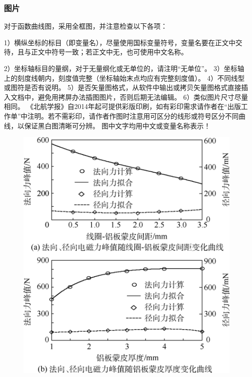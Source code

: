 \documentclass[10.5pt,twocolumn]{jbuaa}
\begin{document}
 \subsubsection{图片}
 对于函数曲线图，采用全框图，并注意检查以下各项：
 
 1）横纵坐标的标目（即变量名），尽量使用国标变量符号，变量名要在正文中交待，且与正文中符号一致；若正文中无，也可使用中文名称。
 
 2）坐标轴标目的量纲，对于无量纲化或无单位的，请注明``无单位”。
 3）坐标轴上的刻度线朝内，刻度值完整（坐标轴始末点均应有完整刻度值）。
 4）不同线型或图符是否有说明。
 5）是否矢量图格式，从软件中输出或拷贝矢量图格式直接插入文档中，避免用拷屏办法插图图片，否则后期无法编辑。
 6）类似图片尺寸尽量相同。
 《北航学报》自2014年起可提供彩版印刷，如有彩印需求请作者在“出版工作单”中注明。若不需彩印，请作者作图时注意用可区分的线形或符号区分不同曲线，以保证黑白图清晰可分辨。 
 图中文字均用中文或变量名称表示！
 \begin{figure}[b!]
 \centering
 \includegraphics [scale=1,trim=0 0 0 0]{./image/tu1.png}
 \end{figure}
\end{document}
